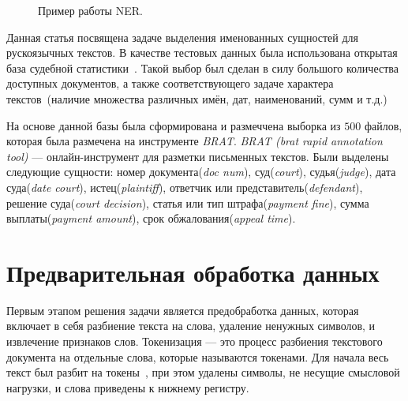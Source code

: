\documentclass{csmathnotes}
\begin{document}
\begin{figure}[h]
    \caption{Пример работы NER.}
    \label{fig:ner}
\end{figure}


Данная статья посвящена задаче выделения именованных сущностей для рускоязычных текстов.
В качестве тестовых данных была использована открытая база судебной статистики~\cite{CourtsData}.
Такой выбор был сделан в силу большого количества доступных документов, а также соответствующего задаче характера текстов~(наличие множества различных имён, дат, наименований, сумм и т.д.)

На основе данной базы была сформирована и размеччена выборка из $500$ файлов, которая была размечена на инструменте \emph{BRAT}. \emph{BRAT (brat rapid annotation tool)} — онлайн-инструмент для разметки письменных текстов. Были выделены следующие сущности: номер документа(\emph{doc num}), суд(\emph{court}), судья(\emph{judge}), дата суда(\emph{date court}), истец(\emph{plaintiff}), ответчик или представитель(\emph{defendant}), решение суда(\emph{court decision}), статья или тип штрафа(\emph{payment fine}), сумма выплаты(\emph{payment amount}), срок обжалования(\emph{appeal time}).


\section*{Предварительная обработка данных}
Первым этапом решения задачи является предобработка данных, которая включает в себя разбиение текста на слова, удаление ненужных символов, и извлечение признаков слов. 
Токенизация — это процесс разбиения текстового документа на отдельные слова, которые называются токенами.
Для начала весь текст был разбит на токены~\cite{Ner}, при этом удалены символы, не несущие смысловой нагрузки, и слова приведены к нижнему регистру.
\end{document}
